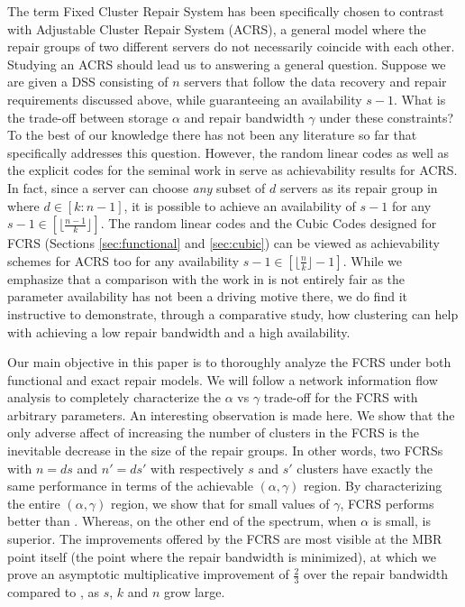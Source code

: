\documentclass[journal,onecolumn,draftcls]{IEEEtran}
\begin{document}
The term Fixed Cluster Repair System has been specifically chosen to contrast with Adjustable Cluster Repair System (ACRS), a general model where the repair groups of two different servers do not necessarily coincide with each other. Studying an ACRS should lead us to answering a general question. Suppose we are given a DSS consisting of $n$ servers that follow the data recovery and repair requirements discussed above, while guaranteeing an availability $s-1$. What is the trade-off between storage $\alpha$ and repair bandwidth $\gamma$ under these constraints? To the best of our knowledge there has not been any literature so far that specifically addresses this question. However, the random linear codes as well as the explicit codes for the seminal work in \cite{dimakis2010network} serve as achievability results for ACRS. In fact, since a server can choose {\it any} subset of $d$ servers as its repair group in \cite{dimakis2010network} where $d\in[k:n-1]$, it is possible to achieve an availability of $s-1$ for any $s -1 \in [\lfloor\frac{n-1}{k}\rfloor]$. The random linear codes and the Cubic Codes designed for FCRS (Sections \ref{sec:functional} and \ref{sec:cubic}) can be viewed as achievability schemes for ACRS too for any availability $s-1\in[\lfloor\frac{n}{k}\rfloor-1]$. While we emphasize that a comparison with the work in \cite{dimakis2010network} is not entirely fair as the parameter availability has not been a driving motive there, we do find it instructive to demonstrate, through a comparative study, how clustering can help with achieving a low repair bandwidth and a high availability. 


Our main objective in this paper is to thoroughly analyze the FCRS under both functional and exact repair models. We will follow a network information flow analysis to completely characterize the $\alpha$ vs $\gamma$ trade-off for the FCRS with arbitrary parameters. An interesting observation is made here. We show that the only adverse affect of increasing the number of clusters in the FCRS is the inevitable decrease in the size of the repair groups. In other words, two FCRSs with $n = ds$ and $n' = ds'$ with respectively $s$ and $s'$ clusters have exactly the same performance in terms of the achievable $(\alpha,\gamma)$ region. By characterizing the entire $(\alpha,\gamma)$ region, we show that for small values of $\gamma$, FCRS performs  better than  \cite{dimakis2010network}. Whereas, on the other end of the spectrum, when $\alpha$ is small, \cite{dimakis2010network} is superior. The improvements offered by the FCRS are most visible at the MBR point itself (the point where the repair bandwidth is minimized), at which we prove an asymptotic multiplicative improvement of $\frac{2}{3}$ over the repair bandwidth compared to \cite{dimakis2010network}, as $s$, $k$ and $n$ grow large.  
\end{document}

